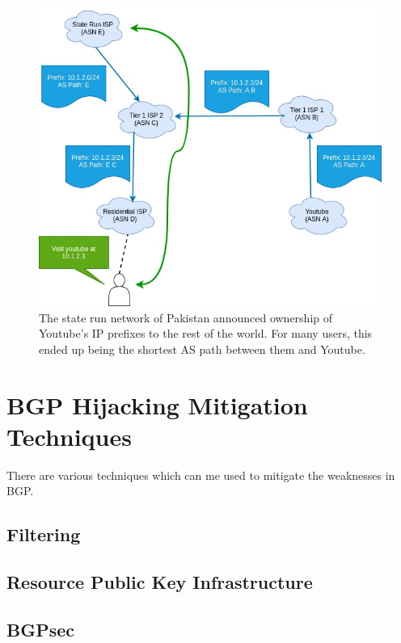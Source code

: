 \documentclass[conference]{IEEEtran}
\begin{document}
\begin{figure}
  \includegraphics[width=\linewidth]{images/bgp-hijack.jpg}
  \caption{The state run network of Pakistan announced ownership of Youtube's IP prefixes to the rest of the world.  For many users, this ended up being the shortest AS path between them and Youtube.}
  \label{fig:bgp-hijack}
\end{figure}

\section{BGP Hijacking Mitigation Techniques}
There are various techniques which can me used to mitigate the weaknesses in BGP.

\subsection{Filtering}

\subsection{Resource Public Key Infrastructure}

\subsection{BGPsec}
\end{document}
